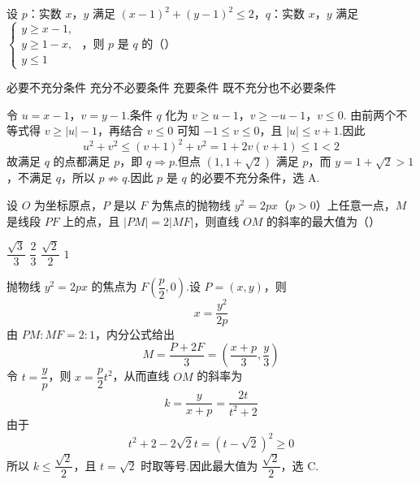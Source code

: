 \begin{problem}
设 \(p\)：实数 \(x\)，\(y\) 满足 \(\left(x-1\right)^2+\left(y-1\right)^2\le2\)，\(q\)：实数 \(x\)，\(y\) 满足
\(\begin{cases}
y\ge x-1,\\
y\ge 1-x,\\
y\le 1
\end{cases}\)
，则 \(p\) 是 \(q\) 的（\quad）

\choices
    {必要不充分条件}
    {充分不必要条件}
    {充要条件}
    {既不充分也不必要条件}

\begin{solution}
令 \(u=x-1\)，\(v=y-1\).条件 \(q\) 化为
\(v\geq u-1\)，\(v\geq-u-1\)，\(v\leq0\).
由前两个不等式得 \(v\geq |u|-1\)，再结合 \(v\leq0\) 可知 \(-1\leq v\leq0\)，且 \(|u|\leq v+1\).因此
\[
u^2+v^2\leq(v+1)^2+v^2=1+2v(v+1)\leq1<2
\]
故满足 \(q\) 的点都满足 \(p\)，即 \(q\Rightarrow p\).但点 \((1,1+\sqrt2)\) 满足 \(p\)，而 \(y=1+\sqrt2>1\)，不满足 \(q\)，所以 \(p\not\Rightarrow q\).因此 \(p\) 是 \(q\) 的必要不充分条件，选 A.
\end{solution}
\end{problem}



\begin{problem}
设 \(O\) 为坐标原点，\(P\) 是以 \(F\) 为焦点的抛物线 \(y^2=2px\)（\(p>0\)）上任意一点，\(M\) 是线段 \(PF\) 上的点，且 \(\left|PM\right|=2\left|MF\right|\)，则直线 \(OM\) 的斜率的最大值为（\quad）

\choices
    {\(\dfrac{\sqrt3}{3}\)}
    {\(\dfrac23\)}
    {\(\dfrac{\sqrt2}{2}\)}
    {\(1\)}

\begin{solution}
抛物线 \(y^2=2px\) 的焦点为 \(F\left(\dfrac p2,0\right)\).设 \(P=(x,y)\)，则
\[
x=\frac{y^2}{2p}
\]
由 \(PM:MF=2:1\)，内分公式给出
\[
M=\frac{P+2F}{3}=\left(\frac{x+p}{3},\frac y3\right)
\]
令 \(t=\dfrac yp\)，则 \(x=\dfrac p2t^2\)，从而直线 \(OM\) 的斜率为
\[
k=\frac{y}{x+p}=\frac{2t}{t^2+2}
\]
由于
\[
t^2+2-2\sqrt2t=(t-\sqrt2)^2\geq0
\]
所以 \(k\leq\dfrac{\sqrt2}{2}\)，且 \(t=\sqrt2\) 时取等号.因此最大值为 \(\dfrac{\sqrt2}{2}\)，选 C.
\end{solution}
\end{problem}



